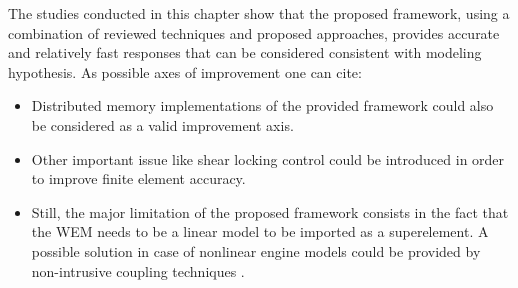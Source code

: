The studies conducted in this chapter show that the proposed framework, using a combination of reviewed techniques and proposed approaches, provides accurate and relatively fast responses that can be considered consistent with modeling hypothesis.
As possible axes of improvement one can cite:
\begin{itemize}
\item Distributed memory implementations of the provided framework could also be considered as a valid improvement axis. 
\item Other important issue like shear locking control could be introduced in order to improve finite element accuracy.
\item  Still, the major limitation of the proposed framework consists in the fact that the WEM needs to be a linear model to be imported as a superelement. A possible solution in case of nonlinear engine models could be provided by non-intrusive coupling techniques \cite{Gendre2009}.
\end{itemize}
